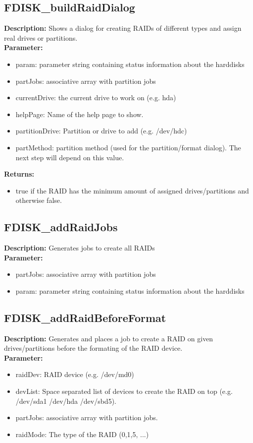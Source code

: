 \subsection{FDISK\_buildRaidDialog}
\textbf{Description:} Shows a dialog for creating RAIDs of different types and assign real drives or partitions.\\
\textbf{Parameter:}
\begin{itemize}
\item param: parameter string containing status information about the harddisks
\item partJobs: associative array with partition jobs
\item currentDrive: the current drive to work on (e.g. hda)
\item helpPage: Name of the help page to show.
\item partitionDrive: Partition or drive to add (e.g. /dev/hdc)
\item partMethod: partition method (used for the partition/format dialog). The next step will depend on this value.
\end{itemize}
\textbf{Returns:}
\begin{itemize}
\item true if the RAID has the minimum amount of assigned drives/partitions and otherwise false.
\end{itemize}

\subsection{FDISK\_addRaidJobs}
\textbf{Description:} Generates jobs to create all RAIDs\\
\textbf{Parameter:}
\begin{itemize}
\item partJobs: associative array with partition jobs
\item param: parameter string containing status information about the harddisks
\end{itemize}

\subsection{FDISK\_addRaidBeforeFormat}
\textbf{Description:} Generates and places a job to create a RAID on given drives/partitions before the formating of the RAID device.\\
\textbf{Parameter:}
\begin{itemize}
\item raidDev: RAID device (e.g. /dev/md0)
\item devList: Space separated list of devices to create the RAID on top (e.g. /dev/sda1 /dev/hda /dev/sbd5).
\item partJobs: associative array with partition jobs.
\item raidMode: The type of the RAID (0,1,5, ...)
\end{itemize}

